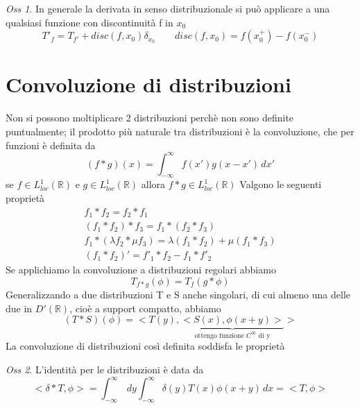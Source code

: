 \documentclass[a4paper,11pt]{report}
\theoremstyle{remark}
\newtheorem*{oss}{Oss}
\theoremstyle{definition}
\newcommand{\R}{\mathbb{R}}
\begin{document}
\begin{oss}
	In generale la derivata in senso distribuzionale si può applicare a una qualsiasi funzione con discontinuità f in $x_0$
	\begin{equation*}
		T'_f = T_{f'} + disc(f,x_0)\delta_{x_0} \qquad disc(f,x_0) = f(x^+_0)-f(x^-_0)
	\end{equation*}
\end{oss}

\section{Convoluzione di distribuzioni}

Non si possono moltiplicare 2 distribuzioni perchè non sono definite puntualmente; il prodotto più naturale tra distribuzioni è la convoluzione, che per funzioni è definita da 
\begin{equation*}
	(f*g) (x)= \int_{-\infty}^\infty f(x')g(x-x')\, dx'
\end{equation*}
se $f\in L^1_{loc}(\R)$ e $g\in L^1_{loc}(\R)$ allora $f*g \in L^1_{loc}(\R)$ \newline
Valgono le seguenti proprietà
\begin{gather*}
	f_1*f_2 = f_2*f_1 \\
	(f_1*f_2)*f_3 = f_1*(f_2*f_3)\\
	f_1*(\lambda f_2 * \mu f_3) = \lambda(f_1*f_2) + \mu(f_1*f_3) \\
	(f_1*f_2)' = f'_1*f_2 - f_1*f'_2
\end{gather*}
Se applichiamo la convoluzione a distribuzioni regolari abbiamo
\begin{equation*}
	T_{f*g} (\phi)= T_f(g*\phi) 
\end{equation*}
Generalizzando a due distribuzioni T e S anche singolari, di cui almeno una delle due in $D'(\R)$, cioè a support compatto, abbiamo
\begin{equation*}
	(T*S)(\phi) = <T(y), \underbrace{<S(x),\phi(x+y)>}_{\text{ottengo funzione $C^\infty$ di y}}>
\end{equation*}
La convoluzione di distribuzioni così definita soddisfa le proprietà

\begin{oss}
	L'identità per le distribuzioni è data da
	\begin{equation*}
		<\delta*T,\phi> = \int_{-\infty}^\infty \, dy \int_{-\infty}^\infty \delta(y)T(x)\phi(x+y) \, dx = <T,\phi>
	\end{equation*}
\end{oss}
\end{document}
